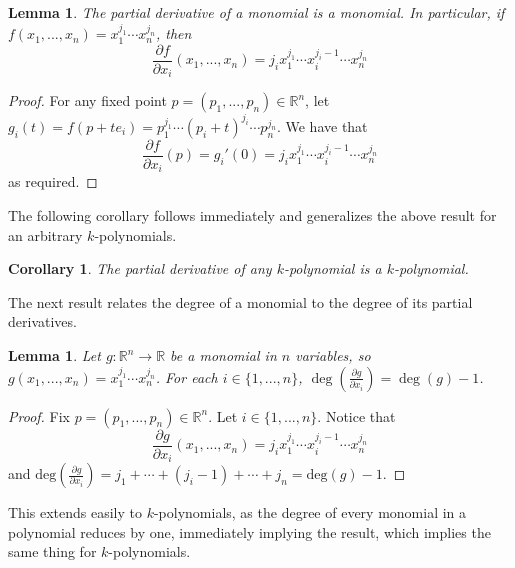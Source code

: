 \documentclass{article}
\theoremstyle{plain} %
\numberwithin{thm}{section} %
\newtheorem{lemma}[thm]{Lemma}
\newtheorem{prop}[thm]{Proposition}
\newtheorem{cor}[thm]{Corollary}
\theoremstyle{definition}
\begin{document}

    \begin{lemma}
        The partial derivative of a monomial is a monomial. In particular, if \(f(x_1, ..., x_n) = x_1^{j_1} \cdots x_n^{j_n}\), then
        \[
            \frac{\partial f}{\partial x_i}(x_1, ..., x_n) = j_i x_1^{j_1} \cdots x_i^{j_i - 1} \cdots x_n^{j_n}
        \]
    \end{lemma}
    \begin{proof}
        For any fixed point \(p = (p_1, ..., p_n) \in \mathbb{R}^n\), let \(g_i(t) = f(p + te_i) = p_1^{j_1} \cdots (p_i + t)^{j_i} \cdots p_n^{j_n}\). We have that
        \[
            \frac{\partial f}{\partial x_i} (p) = g_i'(0) = j_i x_1^{j_1} \cdots x_i^{j_i - 1} \cdots x_n^{j_n}
        \]
        as required.
    \end{proof}
    The following corollary follows immediately and generalizes the above result for an arbitrary \(k\)-polynomials.
    \begin{cor}
        The partial derivative of any \(k\)-polynomial is a \(k\)-polynomial.
    \end{cor}
    The next result relates the degree of a monomial to the degree of its partial derivatives.
    \begin{lemma}
        Let \(g : \mathbb{R}^n \to \mathbb{R}\) be a monomial in \(n\) variables, so \(g(x_1, ..., x_n) = x_1^{j_1}\cdots x_n^{j_n}\). For each \(i \in \{1, ..., n\}\), \(\deg \left( \frac{\partial g}{\partial x_i} \right) = \deg (g) - 1\).
    \end{lemma}
    \begin{proof}
        Fix \(p = (p_1, ..., p_n) \in \mathbb{R}^n\). Let \(i \in \{1, ..., n\}\). Notice that
        \[
            \frac{\partial g}{\partial x_i} (x_1, ..., x_n) = j_i x_1^{j_1} \cdots x_i^{j_i - 1} \cdots x_n^{j_n}
        \]
        and \(\mathrm{deg} \left( \frac{\partial g}{\partial x_i} \right) = j_1 + \cdots + (j_i - 1) + \cdots + j_n = \mathrm{deg} (g) - 1\).
        \smallbreak
    \end{proof}
    This extends easily to \(k\)-polynomials, as the degree of every monomial in a polynomial reduces by one, immediately implying the result, which implies the same thing for \(k\)-polynomials.
\end{document}
